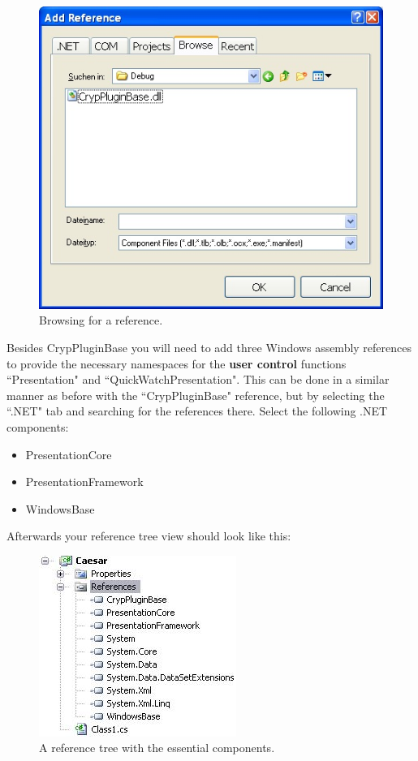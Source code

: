 \begin{figure}[h!]
	\centering
		\includegraphics{figures/browse_reference.jpg}
	\caption{Browsing for a reference.}
	\label{fig:browse_reference}
\end{figure}

\noindent Besides CrypPluginBase you will need to add three Windows assembly references to provide the necessary namespaces for the \textbf{user control} functions ``Presentation" and ``QuickWatchPresentation". This can be done in a similar manner as before with the ``CrypPluginBase" reference, but by selecting the ``.NET" tab and searching for the references there. Select the following .NET components:

\begin{itemize}
    \item PresentationCore
    \item PresentationFramework
    \item WindowsBase
\end{itemize}
\clearpage

\noindent Afterwards your reference tree view should look like this:

\begin{figure}[h!]
		\includegraphics{figures/reference_tree.jpg}
	\caption{A reference tree with the essential components.}
	\label{fig:reference_tree}
\end{figure}

